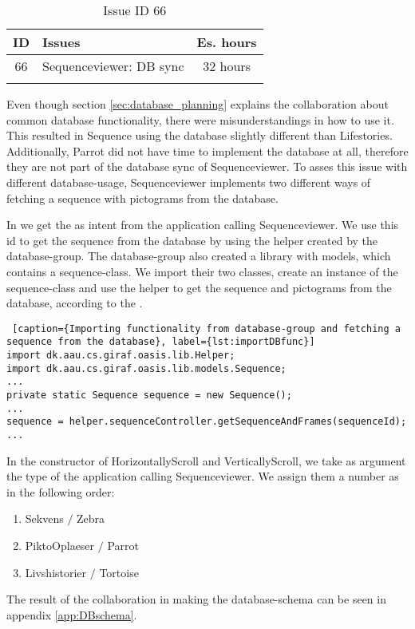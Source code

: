 \begin{longtable} { | c | p{12cm} | c | } 
\hline
	ID 	&	Issues	&		 Es. hours \\\hline
	 66	&	Sequenceviewer: DB sync	&	32 hours \\\hline
\caption{Issue ID 66}
\label{tab:spr4_SVdbSync}
\end{longtable}

Even though section \ref{sec:database_planning} explains the collaboration about common database functionality, there were misunderstandings in how to use it. This resulted in Sequence using the database slightly different than Lifestories. Additionally, Parrot did not have time to implement the database at all, therefore they are not part of the database sync of Sequenceviewer. To asses this issue with different database-usage, Sequenceviewer implements two different ways of fetching a sequence with pictograms from the database. 

In  we get the  as intent from the application calling Sequenceviewer. We use this id to get the sequence from the database by using the helper created by the database-group. The database-group also created a library with models, which contains a sequence-class. We import their two classes, create an instance of the sequence-class and use the helper to get the sequence and pictograms from the database, according to the .

\begin{lstlisting} [caption={Importing functionality from database-group and fetching a sequence from the database}, label={lst:importDBfunc}]
import dk.aau.cs.giraf.oasis.lib.Helper;
import dk.aau.cs.giraf.oasis.lib.models.Sequence;
...
private static Sequence sequence = new Sequence();
...
sequence = helper.sequenceController.getSequenceAndFrames(sequenceId);
...
\end{lstlisting}

In the constructor of HorizontallyScroll and VerticallyScroll, we take as argument the type of the application calling Sequenceviewer. We assign them a number as in the following order:
\begin{enumerate}
\item Sekvens $/$ Zebra
\item PiktoOplaeser $/$ Parrot
\item Livshistorier $/$ Tortoise
\end{enumerate}

The result of the collaboration in making the database-schema can be seen in appendix \ref{app:DBschema}. 

